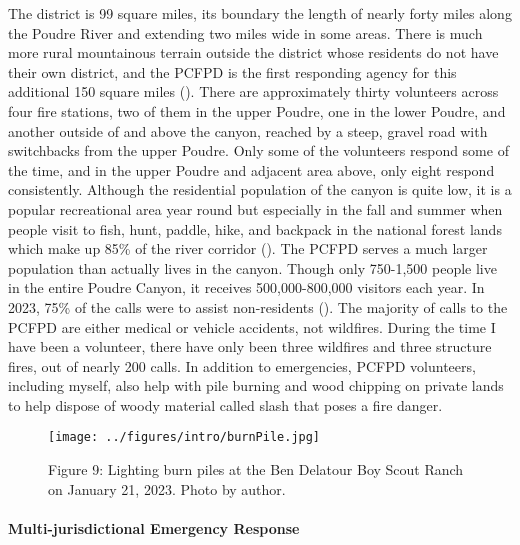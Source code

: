 \documentclass[
]{article}
\begin{document}
The district is 99 square miles, its boundary the length of nearly forty miles along the Poudre River and extending two miles wide in some areas. There is much more rural mountainous terrain outside the district whose residents do not have their own district, and the PCFPD is the first responding agency for this additional 150 square miles (). There are approximately thirty volunteers across four fire stations, two of them in the upper Poudre, one in the lower Poudre, and another outside of and above the canyon, reached by a steep, gravel road with switchbacks from the upper Poudre. Only some of the volunteers respond some of the time, and in the upper Poudre and adjacent area above, only eight respond consistently. Although the residential population of the canyon is quite low, it is a popular recreational area year round but especially in the fall and summer when people visit to fish, hunt, paddle, hike, and backpack in the national forest lands which make up 85\% of the river corridor (). The PCFPD serves a much larger population than actually lives in the canyon. Though only 750-1,500 people live in the entire Poudre Canyon, it receives 500,000-800,000 visitors each year. In 2023, 75\% of the calls were to assist non-residents (). The majority of calls to the PCFPD are either medical or vehicle accidents, not wildfires. During the time I have been a volunteer, there have only been three wildfires and three structure fires, out of nearly 200 calls. In addition to emergencies, PCFPD volunteers, including myself, also help with pile burning and wood chipping on private lands to help dispose of woody material called slash that poses a fire danger.

\begin{figure}
\centering
\texttt{[image: ../figures/intro/burnPile.jpg]}
\caption{Figure 9: Lighting burn piles at the Ben Delatour Boy Scout Ranch on January 21, 2023. Photo by author.}
\end{figure}

\paragraph{Multi-jurisdictional Emergency Response}\label{multi-jurisdictional-emergency-response}
\end{document}
